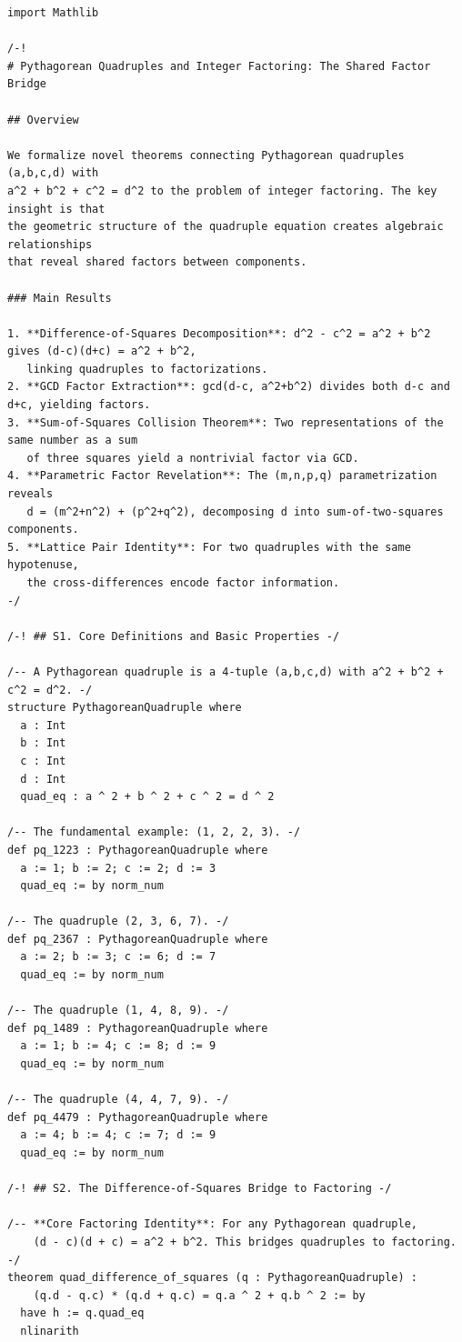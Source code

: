 \documentclass[11pt,openright,twoside]{book}
\theoremstyle{definition}
\begin{document}
\begin{lstlisting}[style=lean]
import Mathlib

/-!
# Pythagorean Quadruples and Integer Factoring: The Shared Factor Bridge

## Overview

We formalize novel theorems connecting Pythagorean quadruples (a,b,c,d) with
a^2 + b^2 + c^2 = d^2 to the problem of integer factoring. The key insight is that
the geometric structure of the quadruple equation creates algebraic relationships
that reveal shared factors between components.

### Main Results

1. **Difference-of-Squares Decomposition**: d^2 - c^2 = a^2 + b^2 gives (d-c)(d+c) = a^2 + b^2,
   linking quadruples to factorizations.
2. **GCD Factor Extraction**: gcd(d-c, a^2+b^2) divides both d-c and d+c, yielding factors.
3. **Sum-of-Squares Collision Theorem**: Two representations of the same number as a sum
   of three squares yield a nontrivial factor via GCD.
4. **Parametric Factor Revelation**: The (m,n,p,q) parametrization reveals
   d = (m^2+n^2) + (p^2+q^2), decomposing d into sum-of-two-squares components.
5. **Lattice Pair Identity**: For two quadruples with the same hypotenuse,
   the cross-differences encode factor information.
-/

/-! ## S1. Core Definitions and Basic Properties -/

/-- A Pythagorean quadruple is a 4-tuple (a,b,c,d) with a^2 + b^2 + c^2 = d^2. -/
structure PythagoreanQuadruple where
  a : Int
  b : Int
  c : Int
  d : Int
  quad_eq : a ^ 2 + b ^ 2 + c ^ 2 = d ^ 2

/-- The fundamental example: (1, 2, 2, 3). -/
def pq_1223 : PythagoreanQuadruple where
  a := 1; b := 2; c := 2; d := 3
  quad_eq := by norm_num

/-- The quadruple (2, 3, 6, 7). -/
def pq_2367 : PythagoreanQuadruple where
  a := 2; b := 3; c := 6; d := 7
  quad_eq := by norm_num

/-- The quadruple (1, 4, 8, 9). -/
def pq_1489 : PythagoreanQuadruple where
  a := 1; b := 4; c := 8; d := 9
  quad_eq := by norm_num

/-- The quadruple (4, 4, 7, 9). -/
def pq_4479 : PythagoreanQuadruple where
  a := 4; b := 4; c := 7; d := 9
  quad_eq := by norm_num

/-! ## S2. The Difference-of-Squares Bridge to Factoring -/

/-- **Core Factoring Identity**: For any Pythagorean quadruple,
    (d - c)(d + c) = a^2 + b^2. This bridges quadruples to factoring. -/
theorem quad_difference_of_squares (q : PythagoreanQuadruple) :
    (q.d - q.c) * (q.d + q.c) = q.a ^ 2 + q.b ^ 2 := by
  have h := q.quad_eq
  nlinarith


\end{lstlisting}
\end{document}
